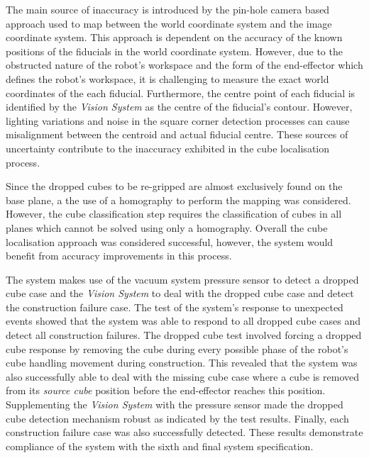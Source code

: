 The main source of inaccuracy is introduced by the pin-hole camera based approach used to map between the world coordinate system and the image coordinate system. This approach is dependent on the accuracy of the known positions of the fiducials in the world coordinate system. However, due to the obstructed nature of the robot's workspace and the form of the end-effector which defines the robot's workspace, it is challenging to measure the exact world coordinates of the each fiducial. Furthermore, the centre point of each fiducial is identified by the \textit{Vision System} as the centre of the fiducial's contour. However, lighting variations and noise in the square corner detection processes can cause misalignment between the centroid and actual fiducial centre. These sources of uncertainty contribute to the inaccuracy exhibited in the cube localisation process. 

Since the dropped cubes to be re-gripped are almost exclusively found on the base plane, a the use of a homography to perform the mapping was considered. However, the cube classification step requires the classification of cubes in all planes which cannot be solved using only a homography. Overall the cube localisation approach was considered successful, however, the system would benefit from accuracy improvements in this process.

The system makes use of the vacuum system pressure sensor to detect a dropped cube case and the \textit{Vision System} to deal with the dropped cube case and detect the construction failure case. The test of the system's response to unexpected events showed that the system was able to respond to all dropped cube cases and detect all construction failures. The dropped cube test involved forcing a dropped cube response by removing the cube during every possible phase of the robot's cube handling movement during construction. This revealed that the system was also successfully able to deal with the missing cube case where a cube is removed from its \textit{source cube} position before the end-effector reaches this position. Supplementing the \textit{Vision System} with the pressure sensor made the dropped cube detection mechanism robust as indicated by the test results. Finally, each construction failure case was also successfully detected. These results demonstrate compliance of the system with the sixth and final system specification.





